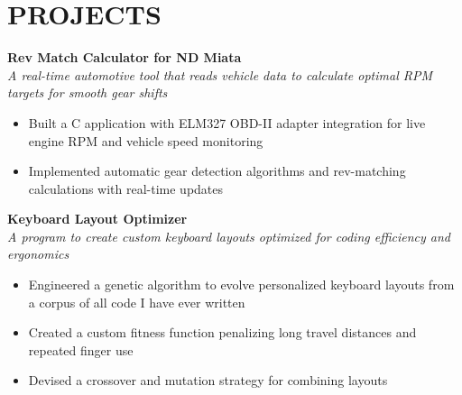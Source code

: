 \section*{PROJECTS}



\noindent
\textbf{Rev Match Calculator for ND Miata} \\
\textit{A real-time automotive tool that reads vehicle data to calculate optimal RPM targets for smooth gear shifts}
\begin{itemize}
	\item Built a C application with ELM327 OBD-II adapter integration for live engine RPM and vehicle speed monitoring
	\item Implemented automatic gear detection algorithms and rev-matching calculations with real-time updates
\end{itemize}


\noindent
\textbf{Keyboard Layout Optimizer} \\
\textit{A program to create custom keyboard layouts optimized for coding efficiency and ergonomics}
\begin{itemize}
	\item Engineered a genetic algorithm to evolve personalized keyboard layouts from a corpus of all code I have ever written
	\item Created a custom fitness function penalizing long travel distances and repeated finger use
	\item Devised a crossover and mutation strategy for combining layouts
\end{itemize}

